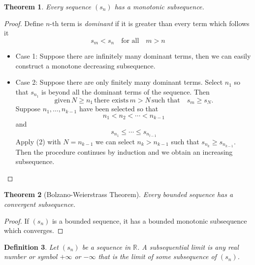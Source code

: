 \documentclass[12pt, lettersize]{book}
\newtheorem{thm}{Theorem}[section]
\newtheorem{dfn}[thm]{Definition}
\begin{document}
		\begin{thm}
		Every sequence $(s_n)$ has a monotonic subsequence.
		\end{thm}
		\setcounter{equation}{0}
		\begin{proof}
		Define $n$-th term is \emph{dominant} if it is greater than every term which follows it
		\begin{equation}
			s_m<s_n\quad\text{for all}\quad m>n
		\end{equation}
		\begin{itemize}
			\item Case 1: Suppose there are infinitely many dominant terms, then we can easily construct a monotone decreasing subsequence.
			\item Case 2: Suppose there are only finitely many dominant terms. Select $n_1$ so that $s_{n_1}$ is beyond
			all the dominant terms of the sequence. Then
			\begin{equation}
				\text{given}\,N\geq n_1\,\text{there exists}\,m>N\,\text{such that}\quad s_m\geq s_N. 
			\end{equation}
		Suppose $n_1,\dots,n_{k-1}$ have been selected so that
		\begin{equation}
			n_1<n_2<\cdots<n_{k-1}
		\end{equation}
		and
		\begin{equation}
			s_{n_1}\leq\cdots\leq s_{n_{l-1}}
		\end{equation}
		Apply (2) with $N=n_{k-1}$ we can select $n_k>n_{k-1}$ such that $s_{n_k}\geq s_{n_{k-1}}$. Then the procedure continues by induction and we obtain an increasing subsequence.
		\end{itemize}
		\end{proof}
		
		\begin{thm}[Bolzano-Weierstrass Theorem]\label{def:B-W}
			Every bounded sequence has a convergent subsequence.
		\end{thm}
		\begin{proof}
			If $(s_n)$ is a bounded sequence, it has a bounded monotonic subsequence which converges. 
		\end{proof}
		
		\begin{dfn}
		Let $(s_n)$ be a sequence in $\mathbb{R}$. A \emph{subsequential limit} is any real number or symbol $+\infty$ or $-\infty$ that is the limit of some subsequence of $(s_n)$.
		\end{dfn}
		
\end{document}
